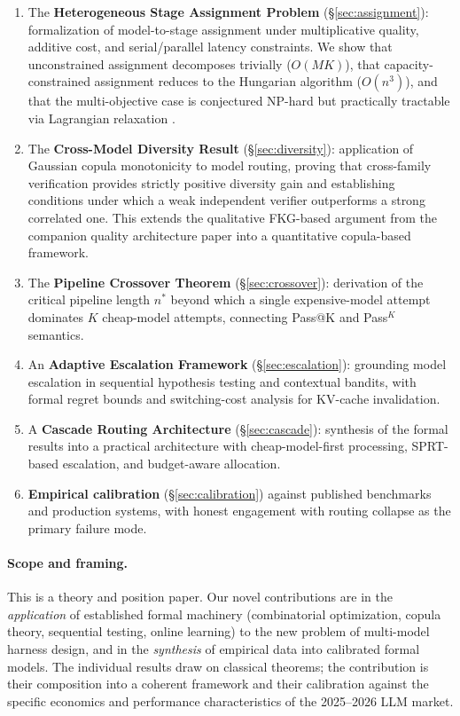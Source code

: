\documentclass[11pt, a4paper, logo, copyright]{googledeepmind}
\begin{document}
\begin{enumerate}
\item The \textbf{Heterogeneous Stage Assignment Problem} (\S\ref{sec:assignment}): formalization of model-to-stage assignment under multiplicative quality, additive cost, and serial/parallel latency constraints. We show that unconstrained assignment decomposes trivially ($O(MK)$), that capacity-constrained assignment reduces to the Hungarian algorithm ($O(n^3)$), and that the multi-objective case is conjectured NP-hard but practically tractable via Lagrangian relaxation \citep{dekoninck2025cascade}.

\item The \textbf{Cross-Model Diversity Result} (\S\ref{sec:diversity}): application of Gaussian copula monotonicity \citep{sklar1959, nelsen2006copulas} to model routing, proving that cross-family verification provides strictly positive diversity gain and establishing conditions under which a weak independent verifier outperforms a strong correlated one. This extends the qualitative FKG-based argument from the companion quality architecture paper into a quantitative copula-based framework.

\item The \textbf{Pipeline Crossover Theorem} (\S\ref{sec:crossover}): derivation of the critical pipeline length $n^*$ beyond which a single expensive-model attempt dominates $K$ cheap-model attempts, connecting Pass@K and Pass${}^K$ semantics.

\item An \textbf{Adaptive Escalation Framework} (\S\ref{sec:escalation}): grounding model escalation in sequential hypothesis testing and contextual bandits, with formal regret bounds and switching-cost analysis for KV-cache invalidation.

\item A \textbf{Cascade Routing Architecture} (\S\ref{sec:cascade}): synthesis of the formal results into a practical architecture with cheap-model-first processing, SPRT-based escalation, and budget-aware allocation.

\item \textbf{Empirical calibration} (\S\ref{sec:calibration}) against published benchmarks and production systems, with honest engagement with routing collapse as the primary failure mode.
\end{enumerate}

\paragraph{Scope and framing.} This is a theory and position paper. Our novel contributions are in the \emph{application} of established formal machinery (combinatorial optimization, copula theory, sequential testing, online learning) to the new problem of multi-model harness design, and in the \emph{synthesis} of empirical data into calibrated formal models. The individual results draw on classical theorems; the contribution is their composition into a coherent framework and their calibration against the specific economics and performance characteristics of the 2025--2026 LLM market.
\end{document}
